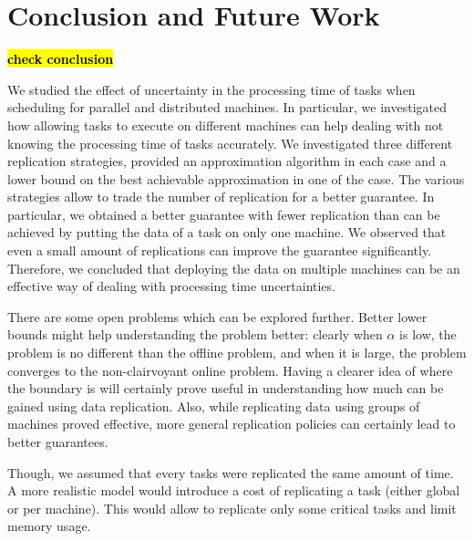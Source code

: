 \documentclass[twocolumn]{svjour3}
\newcommand{\todo}[1]{{\color{red}\textbf{\hl{#1}}\xspace}}
\begin{document}
\section{Conclusion and Future Work}\label{sec8}
\todo{check conclusion}

We studied the effect of uncertainty in the processing time of tasks
when scheduling for parallel and distributed machines. In particular, we
investigated how allowing tasks to execute on different machines can
help dealing with not knowing the processing time of tasks
accurately. We investigated three different replication strategies,
provided an approximation algorithm in each case and a lower bound on the
best achievable approximation in one of the case. The various
strategies allow to trade the number of replication for a better
guarantee. In particular, we obtained a better guarantee with fewer
replication than can be achieved by putting the data of a task on only
one machine. We observed that even a small amount of replications can
improve the guarantee significantly. Therefore, we concluded that
deploying the data on multiple machines can be an effective way of
dealing with processing time uncertainties.

There are some open problems which can be explored further. Better
lower bounds might help understanding the problem better: clearly when
$\alpha$ is low, the problem is no different than the offline problem,
and when it is large, the problem converges to the non-clairvoyant
online problem. Having a clearer idea of where the boundary is will
certainly prove useful in understanding how much can be gained using
data replication. Also, while replicating data using groups of
machines proved effective, more general replication policies can
certainly lead to better guarantees.

Though, we assumed that every tasks were replicated the same amount of
time. A more realistic model would introduce a cost of replicating a
task (either global or per machine). This would allow to replicate
only some critical tasks and limit memory usage.


 
\end{document}
